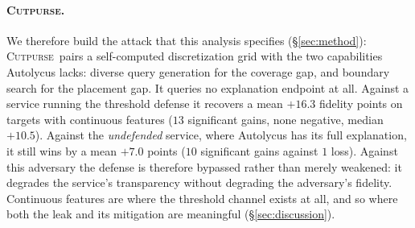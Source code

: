 \documentclass[sigconf,anonymous,review]{acmart}
\newcommand{\sys}{\textsc{Cutpurse}}
\begin{document}
\paragraph{\sys.}
We therefore build the attack that this analysis specifies (\S\ref{sec:method}):
\sys\ pairs a self-computed discretization grid with the two capabilities Autolycus lacks: diverse query generation for the coverage gap, and boundary search for the placement gap. It queries no
explanation endpoint at all. Against a service running the threshold defense it recovers
a mean $+16.3$ fidelity points on targets with continuous features ($13$ significant gains, none
negative, median $+10.5$). Against the \emph{undefended} service, where Autolycus has its full
explanation, it still wins by a mean $+7.0$ points ($10$ significant gains against $1$ loss). Against this adversary the defense is therefore bypassed rather than merely weakened: it degrades the
service's transparency without degrading the adversary's fidelity. Continuous features are where the threshold
channel exists at all, and so where both the leak and its mitigation are meaningful
(\S\ref{sec:discussion}).
\end{document}
